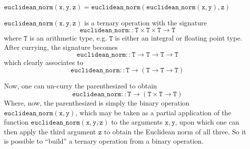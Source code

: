 \begin{Lemma}
    $\mathtt{euclidean\_norm(x, y, z) = euclidean\_norm(euclidean\_norm(x, y), z)}$
\end{Lemma}

\begin{solution}
    $\mathtt{euclidean\_norm(x, y, z)}$ is a ternary operation with the signature
    $$\mathtt{euclidean\_norm :: T \times T \times T \rightarrow T}$$
    where $\mathtt{T}$ is an arithmetic type, e.g. $\mathtt{T}$ is either an integral or floating
    point type. After currying, the signature becomes
    $$\mathtt{euclidean\_norm :: T \rightarrow T \rightarrow T \rightarrow T}$$
    which clearly associates to
    $$\mathtt{euclidean\_norm :: T \rightarrow \left(T \rightarrow T \rightarrow T\right)}$$

    Now, one can un-curry the parenthesized to obtain
    $$\mathtt{euclidean\_norm :: T \rightarrow \left(T \times T \rightarrow T\right)}$$
    Where, now, the parenthesized is simply the binary operation $\mathtt{euclidean\_norm(x, y)}$, which may
    be taken as a partial application of the function $\mathtt{euclidean\_norm(x,y,z)}$ to the arguments
    $\mathtt{x, y}$, upon which one can then apply the third argument $\mathtt{z}$ to obtain the Euclidean norm
    of all three. So it is possible to \enquote{build} a ternary operation from a binary operation.
\end{solution}
